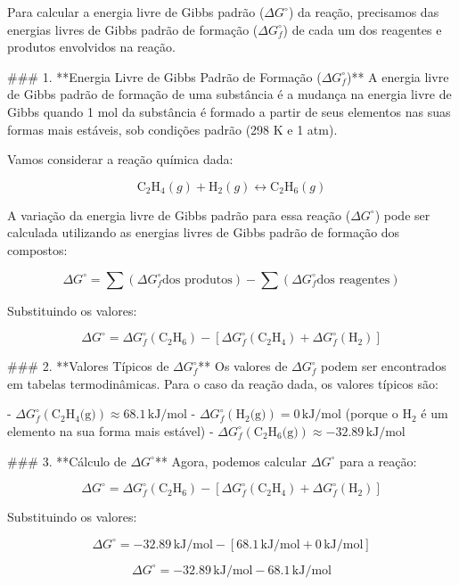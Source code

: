 Para calcular a energia livre de Gibbs padrão (\(\Delta G^\circ\)) da reação, precisamos das energias livres de Gibbs padrão de formação (\( \Delta G_f^\circ \)) de cada um dos reagentes e produtos envolvidos na reação.

### 1. **Energia Livre de Gibbs Padrão de Formação (\(\Delta G_f^\circ\))**
A energia livre de Gibbs padrão de formação de uma substância é a mudança na energia livre de Gibbs quando 1 mol da substância é formado a partir de seus elementos nas suas formas mais estáveis, sob condições padrão (298 K e 1 atm).

Vamos considerar a reação química dada:

\[
\text{C}_2\text{H}_4 (g) + \text{H}_2 (g) \leftrightarrow \text{C}_2\text{H}_6 (g)
\]

A variação da energia livre de Gibbs padrão para essa reação (\(\Delta G^\circ\)) pode ser calculada utilizando as energias livres de Gibbs padrão de formação dos compostos:

\[
\Delta G^\circ = \sum (\Delta G_f^\circ \text{dos produtos}) - \sum (\Delta G_f^\circ \text{dos reagentes})
\]

Substituindo os valores:

\[
\Delta G^\circ = \Delta G_f^\circ (\text{C}_2\text{H}_6) - [\Delta G_f^\circ (\text{C}_2\text{H}_4) + \Delta G_f^\circ (\text{H}_2)]
\]

### 2. **Valores Típicos de \(\Delta G_f^\circ\)**
Os valores de \(\Delta G_f^\circ\) podem ser encontrados em tabelas termodinâmicas. Para o caso da reação dada, os valores típicos são:

- \(\Delta G_f^\circ (\text{C}_2\text{H}_4 \text{(g)}) \approx 68.1 \, \text{kJ/mol}\)
- \(\Delta G_f^\circ (\text{H}_2 \text{(g)}) = 0 \, \text{kJ/mol}\) (porque o \(\text{H}_2\) é um elemento na sua forma mais estável)
- \(\Delta G_f^\circ (\text{C}_2\text{H}_6 \text{(g)}) \approx -32.89 \, \text{kJ/mol}\)

### 3. **Cálculo de \(\Delta G^\circ\)**
Agora, podemos calcular \(\Delta G^\circ\) para a reação:

\[
\Delta G^\circ = \Delta G_f^\circ (\text{C}_2\text{H}_6) - [\Delta G_f^\circ (\text{C}_2\text{H}_4) + \Delta G_f^\circ (\text{H}_2)]
\]

Substituindo os valores:

\[
\Delta G^\circ = -32.89 \, \text{kJ/mol} - [68.1 \, \text{kJ/mol} + 0 \, \text{kJ/mol}]
\]

\[
\Delta G^\circ = -32.89 \, \text{kJ/mol} - 68.1 \, \text{kJ/mol}
\]

